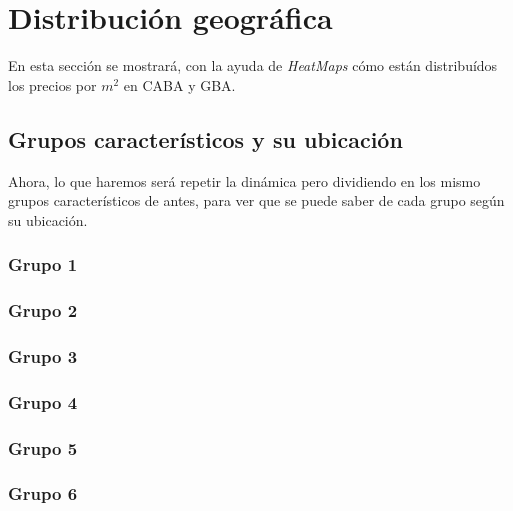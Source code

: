 \documentclass[a4paper, 10pt]{article}
\begin{document}
		\section{Distribución geográfica}
			En esta sección se mostrará, con la ayuda de \emph{HeatMaps} cómo están distribuídos los precios por $m^2$ en CABA
			y GBA.
			\subsection{Grupos característicos y su ubicación}			
				Ahora, lo que haremos será repetir la dinámica pero dividiendo en los mismo grupos característicos de antes, para
				ver que se puede saber de cada grupo según su ubicación.
				\subsubsection{Grupo 1}
				\subsubsection{Grupo 2}
				\subsubsection{Grupo 3}
				\subsubsection{Grupo 4}
				\subsubsection{Grupo 5}
				\subsubsection{Grupo 6}
\end{document}
